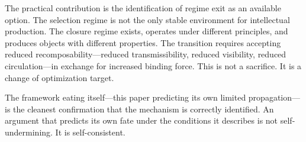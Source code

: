 \documentclass[12pt]{article}
\begin{document}
The practical contribution is the identification of regime exit as an
available option. The selection regime is not the only stable
environment for intellectual production. The closure regime exists,
operates under different principles, and produces objects with different
properties. The transition requires accepting reduced
recomposability---reduced transmissibility, reduced visibility, reduced
circulation---in exchange for increased binding force. This is not a
sacrifice. It is a change of optimization target.

The framework eating itself---this paper predicting its own limited
propagation---is the cleanest confirmation that the mechanism is
correctly identified. An argument that predicts its own fate under the
conditions it describes is not self-undermining. It is self-consistent.
\end{document}
